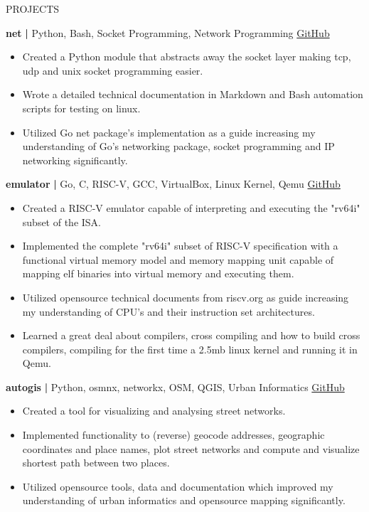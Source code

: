 \documentclass{resume} %
\begin{document}
\begin{rSection}{PROJECTS}
\vspace{-1.25em}
\item \textbf{net} \textbf{|} {Python, Bash, Socket Programming, Network Programming} \hfill \href{https://github.com/Joe-Degs/net}{GitHub}
\begin{itemize}
    \itemsep -3pt {} 
     \item Created a Python module that abstracts away the socket layer making tcp, udp and unix socket programming easier.
    \item Wrote a detailed technical documentation in Markdown and Bash automation scripts for testing on linux.
    \item Utilized Go net package's implementation as a guide increasing my understanding of Go's networking package, socket programming and IP networking significantly.
 \end{itemize}

\item \textbf{emulator} \textbf{|} {Go, C, RISC-V, GCC, VirtualBox, Linux Kernel, Qemu} \hfill \href{https://github.com/Joe-Degs/emulator}{GitHub}
\begin{itemize}
    \itemsep -3pt {} 
     \item Created a RISC-V emulator capable of interpreting and executing the "rv64i" subset of the ISA.
    \item Implemented the complete "rv64i" subset of RISC-V specification with a functional virtual memory model and memory mapping unit capable of mapping elf binaries into virtual memory and executing them.
    \item Utilized opensource technical documents from riscv.org as guide increasing my understanding of CPU's and their instruction set architectures.
    \item Learned a great deal about compilers, cross compiling and how to build cross compilers, compiling for the first time a 2.5mb linux kernel and running it in Qemu.
 \end{itemize}

\item \textbf{autogis} \textbf{|} {Python, osmnx, networkx, OSM, QGIS, Urban Informatics} \hfill \href{https://github.com/Joe-Degs/AutoGIS/tree/master/test-thesis/autogis}{GitHub}
\begin{itemize}
    \itemsep -3pt {} 
     \item Created a tool for visualizing and analysing street networks.
     \item Implemented functionality to (reverse) geocode addresses, geographic coordinates and place names, plot street networks and compute and visualize shortest path between two places.
    \item Utilized opensource tools, data and documentation which improved my understanding of urban informatics and opensource mapping significantly.
 \end{itemize}
\end{rSection} 
\end{document}
